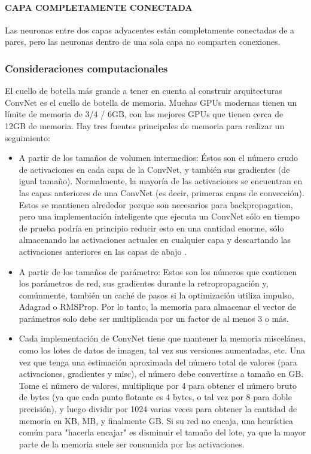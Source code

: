 \documentclass[a4paper,10pt]{article}
\begin{document}
      \paragraph{CAPA COMPLETAMENTE CONECTADA} 
	Las neuronas entre dos capas adyacentes están completamente conectadas de a pares, pero las neuronas dentro de una sola capa no comparten conexiones.

    \subsubsection {Consideraciones computacionales}
      El cuello de botella más grande a tener en cuenta al construir arquitecturas ConvNet es el cuello de botella de memoria. 
      Muchas GPUs modernas tienen un límite de memoria de 3/4 / 6GB, con las mejores GPUs que tienen cerca de 12GB de memoria. 
      Hay tres fuentes principales de memoria para realizar un seguimiento:
      \begin{itemize}
	\item A partir de los tamaños de volumen intermedios: Éstos son el número crudo de activaciones en cada capa de la ConvNet, y también sus gradientes (de igual tamaño). Normalmente, la mayoría de las activaciones se encuentran en las capas anteriores de una ConvNet (es decir, primeras capas de convección). Estos se mantienen alrededor porque son necesarios para backpropagation, pero una implementación inteligente que ejecuta un ConvNet sólo en tiempo de prueba podría en principio reducir esto en una cantidad enorme, sólo almacenando las activaciones actuales en cualquier capa y descartando las activaciones anteriores en las capas de abajo .
	\item A partir de los tamaños de parámetro: Estos son los números que contienen los parámetros de red, sus gradientes durante la retropropagación y, comúnmente, también un caché de pasos si la optimización utiliza impulso, Adagrad o RMSProp. Por lo tanto, la memoria para almacenar el vector de parámetros solo debe ser multiplicada por un factor de al menos 3 o más.
	\item Cada implementación de ConvNet tiene que mantener la memoria miscelánea, como los lotes de datos de imagen, tal vez sus versiones aumentadas, etc.
	Una vez que tenga una estimación aproximada del número total de valores (para activaciones, gradientes y misc), el número debe convertirse a tamaño en GB. Tome el número de valores, multiplique por 4 para obtener el número bruto de bytes (ya que cada punto flotante es 4 bytes, o tal vez por 8 para doble precisión), y luego dividir por 1024 varias veces para obtener la cantidad de memoria en KB, MB, y finalmente GB. Si su red no encaja, una heurística común para "hacerla encajar" es disminuir el tamaño del lote, ya que la mayor parte de la memoria suele ser consumida por las activaciones.
      \end{itemize}
\end{document}
